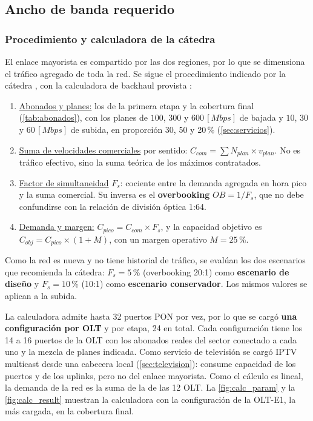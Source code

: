 \subsection{Ancho de banda requerido}
\label{sec:bw_mayorista}

\subsubsection{Procedimiento y calculadora de la cátedra}
El enlace mayorista es compartido por las dos regiones, por lo que se dimensiona el tráfico agregado de toda la red. Se sigue el procedimiento indicado por la cátedra \cite{doc_backhaul}, con la calculadora de backhaul provista \cite{calc_catedra}:
\begin{enumerate}
    \item \underline{Abonados y planes:} los de la primera etapa y la cobertura final (\autoref{tab:abonados}), con los planes de $100$, $300$ y $600 \, [Mbps]$ de bajada y $10$, $30$ y $60 \, [Mbps]$ de subida, en proporción 30, 50 y 20\,\% (\autoref{sec:servicios}).
    \item \underline{Suma de velocidades comerciales} por sentido: $C_{com} = \sum N_{plan} \times v_{plan}$. No es tráfico efectivo, sino la suma teórica de los máximos contratados.
    \item \underline{Factor de simultaneidad} $F_s$: cociente entre la demanda agregada en hora pico y la suma comercial. Su inversa es el \textbf{overbooking} $OB = 1/F_s$, que no debe confundirse con la relación de división óptica 1:64.
    \item \underline{Demanda y margen:} $C_{pico} = C_{com} \times F_s$, y la capacidad objetivo es $C_{obj} = C_{pico} \times (1 + M)$, con un margen operativo $M = 25$\,\%.
\end{enumerate}
Como la red es nueva y no tiene historial de tráfico, se evalúan los dos escenarios que recomienda la cátedra: $F_s = 5$\,\% (overbooking 20:1) como \textbf{escenario de diseño} y $F_s = 10$\,\% (10:1) como \textbf{escenario conservador}. Los mismos valores se aplican a la subida.

La calculadora admite hasta 32 puertos PON por vez, por lo que se cargó \textbf{una configuración por OLT} y por etapa, 24 en total. Cada configuración tiene los 14 a 16 puertos de la OLT con los abonados reales del sector conectado a cada uno y la mezcla de planes indicada. Como servicio de televisión se cargó IPTV multicast desde una cabecera local (\autoref{sec:television}): consume capacidad de los puertos y de los uplinks, pero no del enlace mayorista. Como el cálculo es lineal, la demanda de la red es la suma de la de las 12 OLT. La \autoref{fig:calc_param} y la \autoref{fig:calc_result} muestran la calculadora con la configuración de la OLT-E1, la más cargada, en la cobertura final.

